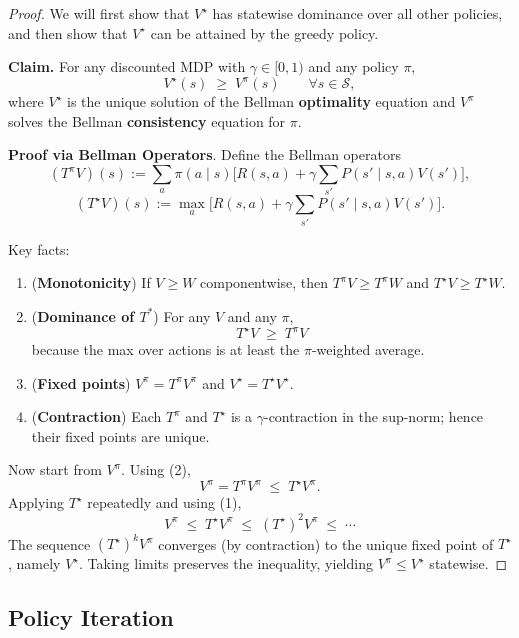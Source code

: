 \documentclass[
]{book}
\providecommand{\tightlist}{%
  \setlength{\itemsep}{0pt}\setlength{\parskip}{0pt}}
\theoremstyle{definition}
\theoremstyle{definition}
\theoremstyle{definition}
\theoremstyle{definition}
\theoremstyle{remark}
\begin{document}
\begin{proof}
We will first show that \(V^\star\) has statewise dominance over all other policies, and then show that \(V^\star\) can be attained by the greedy policy.

\textbf{Claim.} For any discounted MDP with \(\gamma \in [0,1)\) and any policy \(\pi\),
\[
V^\star(s) \;\ge\; V^{\pi}(s)\qquad \forall s\in\mathcal{S},
\]
where \(V^\star\) is the unique solution of the Bellman \textbf{optimality} equation and \(V^\pi\) solves the Bellman \textbf{consistency} equation for \(\pi\).

\textbf{Proof via Bellman Operators}.
Define the Bellman operators
\[
(T^\pi V)(s) := \sum_{a}\pi(a\mid s)\Big[ R(s,a)+\gamma \sum_{s'} P(s'\mid s,a)V(s') \Big],
\]
\[
(T^\star V)(s) := \max_{a}\Big[ R(s,a)+\gamma \sum_{s'} P(s'\mid s,a)V(s') \Big].
\]

Key facts:

\begin{enumerate}
\def\labelenumi{\arabic{enumi}.}
\tightlist
\item
  (\textbf{Monotonicity}) If \(V \ge W\) componentwise, then \(T^\pi V \ge T^\pi W\) and \(T^\star V \ge T^\star W\).
\item
  (\textbf{Dominance of \(T^*\)}) For any \(V\) and any \(\pi\),
  \[
  T^\star V \;\ge\; T^\pi V
  \]
  because the max over actions is at least the \(\pi\)-weighted average.
\item
  (\textbf{Fixed points}) \(V^\pi = T^\pi V^\pi\) and \(V^\star = T^\star V^\star\).
\item
  (\textbf{Contraction}) Each \(T^\pi\) and \(T^\star\) is a \(\gamma\)-contraction in the sup-norm; hence their fixed points are unique.
\end{enumerate}

Now start from \(V^\pi\). Using (2),
\[
V^\pi = T^\pi V^\pi \;\le\; T^\star V^\pi.
\]
Applying \(T^\star\) repeatedly and using (1),
\[
V^\pi \;\le\; T^\star V^\pi \;\le\; (T^\star)^2 V^\pi \;\le\; \cdots
\]
The sequence \((T^\star)^k V^\pi\) converges (by contraction) to the unique fixed point of \(T^\star\), namely \(V^\star\). Taking limits preserves the inequality, yielding \(V^\pi \le V^\star\) statewise.
\end{proof}

\subsection{Policy Iteration}\label{policy-iteration}
\end{document}

